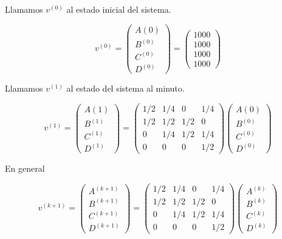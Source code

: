 \documentclass[11pt,a4paper]{article}
\theoremstyle{definition}
\begin{document}
Llamamos $v^{(0)}$ al estado inicial del sistema.

\[
    v^{(0)} = 
        \begin{pmatrix} 
            A{(0)} \\ 
            B^{(0)} \\ 
            C^{(0)} \\ 
            D^{(0)} 
        \end{pmatrix} = 
        \begin{pmatrix} 
            1000 \\ 
            1000 \\ 
            1000 \\ 
            1000 
        \end{pmatrix}
\]

Llamamos $v^{(1)}$ al estado del sistema al minuto. 

\[ 
    v^{(1)} =
    \begin{pmatrix} 
            A{(1)} \\ 
            B^{(1)} \\ 
            C^{(1)} \\ 
            D^{(1)} 
        \end{pmatrix} = 
        \begin{pmatrix}
            1/2 & 1/4 & 0   & 1/4 \\
            1/2 & 1/2 & 1/2 & 0   \\
            0   & 1/4 & 1/2 & 1/4 \\
            0   & 0   & 0   & 1/2
        \end{pmatrix} 
        \begin{pmatrix} 
            A{(0)} \\ 
            B^{(0)} \\ 
            C^{(0)} \\ 
            D^{(0)} 
        \end{pmatrix}
\]

En general

\[  
    v^{(k+1)} =
    \begin{pmatrix} 
            A^{(k+1)} \\ 
            B^{(k+1)} \\ 
            C^{(k+1)} \\ 
            D^{(k+1)} 
        \end{pmatrix} = 
        \begin{pmatrix}
            1/2 & 1/4 & 0   & 1/4 \\
            1/2 & 1/2 & 1/2 & 0   \\
            0   & 1/4 & 1/2 & 1/4 \\
            0   & 0   & 0   & 1/2
        \end{pmatrix} 
        \begin{pmatrix} 
            A^{(k)} \\ 
            B^{(k)} \\ 
            C^{(k)} \\ 
            D^{(k)} 
        \end{pmatrix}
\]
\end{document}
